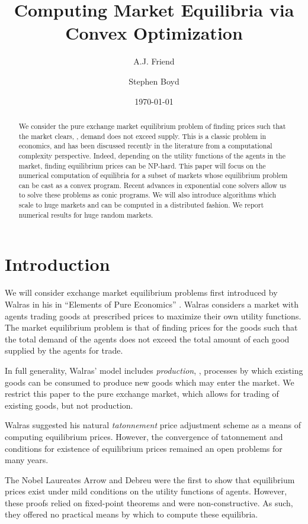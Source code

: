 \documentclass[12pt]{article}
\title{Computing Market Equilibria via Convex Optimization}
\author{A.J. Friend \and Stephen Boyd}
\date{\today}
\begin{document}
\maketitle

\begin{abstract}
We consider the pure exchange market equilibrium problem of finding prices
such that the market clears, \ie, demand does not exceed supply.
This is a classic problem in economics, and has been discussed recently
in the literature from a computational complexity perspective.
Indeed, depending on the utility functions of the agents in the market,
finding equilibrium prices can be NP-hard.
This paper will focus on the numerical computation
of equilibria for a subset of markets whose equilibrium
problem can be cast as a convex program.
Recent advances in exponential cone solvers allow us to solve these problems
as conic programs.
We will also introduce algorithms which scale to huge markets and can be computed
in a distributed fashion.
We report numerical results for huge random markets.
\end{abstract}

\newpage
\tableofcontents
\newpage


\section{Introduction}
We will consider exchange market equilibrium problems first introduced by
Walras in his in ``Elements of Pure Economics''
\cite{walras1896elements}.
Walras considers a market with agents trading
goods at prescribed prices to maximize their own utility functions.
The market equilibrium problem is that of finding prices for the goods
such that the total demand of the agents does not exceed the total amount
of each good supplied by the agents for trade.

In full generality, Walras' model includes \emph{production}, \ie, processes by which existing goods can be consumed to produce new goods which may enter the market.
We restrict this paper to the pure exchange market, which allows for trading of existing goods, but not production.

Walras suggested his natural \emph{tatonnement} price adjustment scheme as a means of computing equilibrium prices.
However, the convergence of tatonnement and conditions for existence of equilibrium prices remained an open problems for many years.

The Nobel Laureates Arrow and Debreu were the first to show that equilibrium
prices exist under mild conditions on the utility functions of agents\cite{arrow1954existence}.
However, these proofs relied on fixed-point theorems and were non-constructive.
As such, they offered no practical means by which to compute these equilibria.
\end{document}
